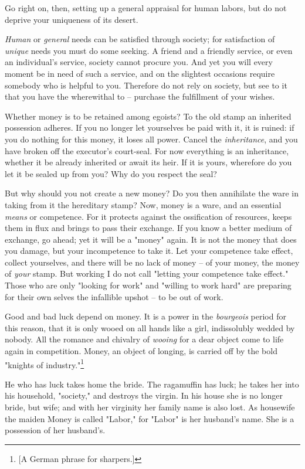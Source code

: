 Go right on, then, setting up a general appraisal for human labors, but do not 
deprive your uniqueness of its desert.

\textit{Human} or \textit{general} needs can be satisfied through society; for 
satisfaction of \textit{unique} needs you must do some seeking. A friend and a 
friendly service, or even an individual's service, society cannot procure you. 
And yet you will every moment be in need of such a service, and on the 
slightest occasions require somebody who is helpful to you. Therefore do not 
rely on society, but see to it that you have the wherewithal to -- purchase 
the fulfillment of your wishes.

Whether money is to be retained among egoists? To the old stamp an inherited 
possession adheres. If you no longer let yourselves be paid with it, it is 
ruined: if you do nothing for this money, it loses all power. Cancel the 
\textit{inheritance}, and you have broken off the executor's court-seal. For 
now everything is an inheritance, whether it be already inherited or await its 
heir. If it is yours, wherefore do you let it be sealed up from you? Why do 
you respect the seal?

But why should you not create a new money? Do you then annihilate the ware in 
taking from it the hereditary stamp? Now, money is a ware, and an essential 
\textit{means} or competence. For it protects against the ossification of 
resources, keeps them in flux and brings to pass their exchange. If you know a 
better medium of exchange, go ahead; yet it will be a "{}money"{} again. It is 
not the money that does you damage, but your incompetence to take it. Let your 
competence take effect, collect yourselves, and there will be no lack of money 
-- of your money, the money of \textit{your} stamp. But working I do not call 
"{}letting your competence take effect."{} Those who are only "{}looking for 
work"{} and "{}willing to work hard"{} are preparing for their own selves the 
infallible upshot -- to be out of work.

Good and bad luck depend on money. It is a power in the \textit{bourgeois} 
period for this reason, that it is only wooed on all hands like a girl, 
indissolubly wedded by nobody. All the romance and chivalry of \textit{wooing} 
for a dear object come to life again in competition. Money, an object of 
longing, is carried off by the bold "{}knights of industry."{}\footnote{[A 
German phrase for sharpers.]}

He who has luck takes home the bride. The ragamuffin has luck; he takes her 
into his household, "{}society,"{} and destroys the virgin. In his house she 
is no longer bride, but wife; and with her virginity her family name is also 
lost. As housewife the maiden Money is called "{}Labor,"{} for "{}Labor"{} is 
her husband's name. She is a possession of her husband's.

